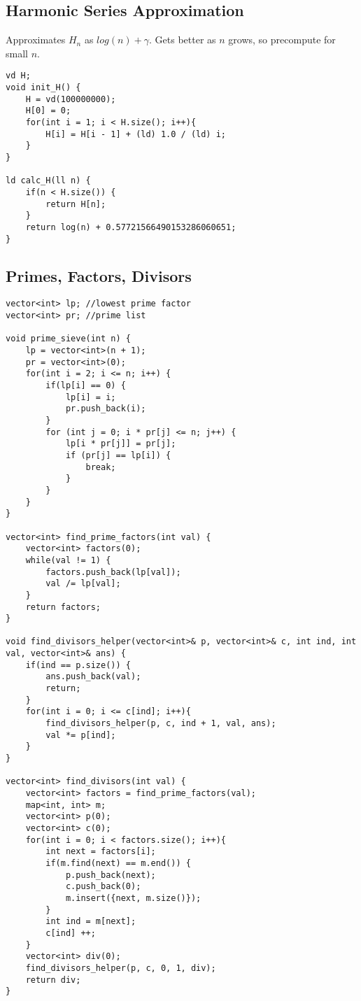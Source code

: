 \documentclass[8pt, headheight=10pt, a4paper]{article}
\begin{document}
\begin{multicols*}{3}
\subsection{Harmonic Series Approximation}
Approximates $H_n$ as $log(n) + \gamma$. Gets better as $n$ grows, so precompute for small $n$. 
\begin{lstlisting}
vd H;
void init_H() {
    H = vd(100000000);
    H[0] = 0;
    for(int i = 1; i < H.size(); i++){
        H[i] = H[i - 1] + (ld) 1.0 / (ld) i;
    }
}

ld calc_H(ll n) {
    if(n < H.size()) {
        return H[n];
    }
    return log(n) + 0.57721566490153286060651;
}
\end{lstlisting}

\subsection{Primes, Factors, Divisors}
\begin{lstlisting}
vector<int> lp; //lowest prime factor 
vector<int> pr; //prime list

void prime_sieve(int n) {
    lp = vector<int>(n + 1);
    pr = vector<int>(0);
    for(int i = 2; i <= n; i++) {
        if(lp[i] == 0) {
            lp[i] = i;
            pr.push_back(i);
        }
        for (int j = 0; i * pr[j] <= n; j++) {
            lp[i * pr[j]] = pr[j];
            if (pr[j] == lp[i]) {
                break;
            }
        }
    }
}

vector<int> find_prime_factors(int val) {
    vector<int> factors(0);
    while(val != 1) {
        factors.push_back(lp[val]);
        val /= lp[val];
    }
    return factors;
}

void find_divisors_helper(vector<int>& p, vector<int>& c, int ind, int val, vector<int>& ans) {
    if(ind == p.size()) {
        ans.push_back(val);
        return;
    }
    for(int i = 0; i <= c[ind]; i++){
        find_divisors_helper(p, c, ind + 1, val, ans);
        val *= p[ind];
    }
}

vector<int> find_divisors(int val) {
    vector<int> factors = find_prime_factors(val);
    map<int, int> m;
    vector<int> p(0);
    vector<int> c(0);
    for(int i = 0; i < factors.size(); i++){
        int next = factors[i];
        if(m.find(next) == m.end()) {
            p.push_back(next);
            c.push_back(0);
            m.insert({next, m.size()});
        }
        int ind = m[next];
        c[ind] ++;
    }
    vector<int> div(0);
    find_divisors_helper(p, c, 0, 1, div);
    return div;
}
\end{lstlisting}


\end{multicols*}
\end{document}

